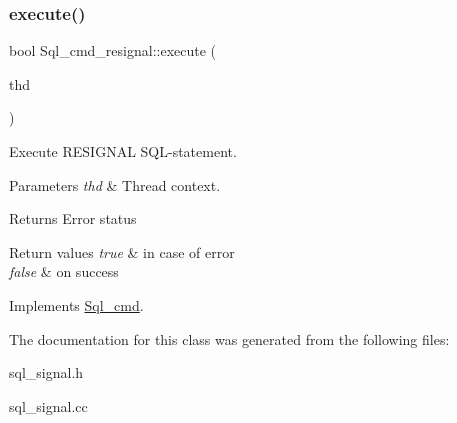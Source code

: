 \subsubsection{\texorpdfstring{execute()}{execute()}}
{\footnotesize\ttfamily bool Sql\+\_\+cmd\+\_\+resignal\+::execute (\begin{DoxyParamCaption}\item[{T\+HD $\ast$}]{thd }\end{DoxyParamCaption})\hspace{0.3cm}{\ttfamily [virtual]}}

Execute R\+E\+S\+I\+G\+N\+AL S\+QL-\/statement.


\begin{DoxyParams}{Parameters}
{\em thd} & Thread context.\\
\hline
\end{DoxyParams}
\begin{DoxyReturn}{Returns}
Error status 
\end{DoxyReturn}

\begin{DoxyRetVals}{Return values}
{\em true} & in case of error \\
\hline
{\em false} & on success \\
\hline
\end{DoxyRetVals}


Implements \mbox{\hyperlink{classSql__cmd_a213367b79b551296fbb7790f2a3732fb}{Sql\+\_\+cmd}}.



The documentation for this class was generated from the following files\+:\begin{DoxyCompactItemize}
\item 
sql\+\_\+signal.\+h\item 
sql\+\_\+signal.\+cc\end{DoxyCompactItemize}
